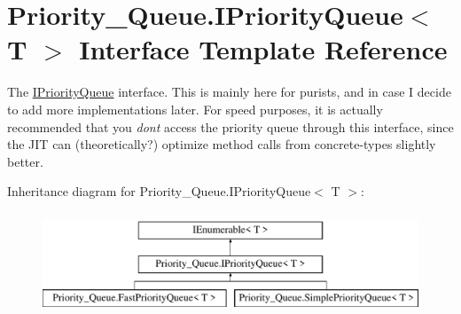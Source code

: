 \hypertarget{interface_priority___queue_1_1_i_priority_queue}{}\section{Priority\+\_\+\+Queue.\+I\+Priority\+Queue$<$ T $>$ Interface Template Reference}
\label{interface_priority___queue_1_1_i_priority_queue}


The \hyperlink{interface_priority___queue_1_1_i_priority_queue}{I\+Priority\+Queue} interface. This is mainly here for purists, and in case I decide to add more implementations later. For speed purposes, it is actually recommended that you {\itshape don\textquotesingle{}t} access the priority queue through this interface, since the J\+IT can (theoretically?) optimize method calls from concrete-\/types slightly better.  


Inheritance diagram for Priority\+\_\+\+Queue.\+I\+Priority\+Queue$<$ T $>$\+:\begin{figure}[H]
\begin{center}
\leavevmode
\includegraphics[height=3.000000cm]{interface_priority___queue_1_1_i_priority_queue}
\end{center}
\end{figure}
